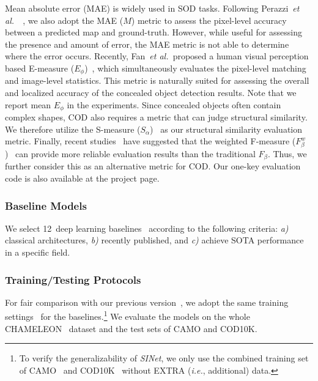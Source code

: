 \documentclass[10pt,journal,compsoc]{IEEEtran}
\def\ie{\emph{i.e.}}
\def\etal{{\em et al.~}}
\def\ournewmodel{\emph{SINet}}
\def\baselineN{12}
\begin{document}
Mean absolute error (MAE) is widely used in SOD tasks.
%
Following Perazzi~\etal~\cite{perazzi2012saliency}, 
we also adopt the MAE ($M$) metric to assess the pixel-level accuracy 
between a predicted map and ground-truth.
%
However, while useful for assessing the presence and amount of error, 
the MAE metric is not able to determine where the error occurs.
%
Recently, Fan~\etal proposed a human visual perception based 
E-measure ($E_\phi$)~\cite{Fan2018Enhanced}, 
which simultaneously evaluates the pixel-level matching and 
image-level statistics.
%
This metric is naturally suited for assessing the overall and
localized accuracy of the concealed object detection results.
%
Note that we report mean $E_\phi$ in the experiments.
%
Since concealed objects often contain complex shapes, 
COD also requires a metric that can judge structural similarity.
%
We therefore utilize the S-measure ($S_\alpha$)~\cite{fan2017structure}
as our structural similarity evaluation metric.
%
Finally, recent studies~\cite{Fan2018Enhanced,fan2017structure} have suggested 
that the weighted F-measure ($F_\beta^w$)~\cite{margolin2014evaluate} 
can provide more reliable evaluation results than the traditional $F_\beta$.
Thus, we further consider this as an alternative metric for COD.
%
Our one-key evaluation code is also available at the project page.


\subsubsection{Baseline Models}


We select \baselineN~deep learning baselines~\cite{lin2017feature,he2017mask,
zhao2017pyramid,zou2018DLMIA,liu2018picanet,huang2019mask,zhao2019pyramid,
wu2019cascaded,chen2019hybrid,zhao2019EGNet,le2019anabranch,fan2020pranet} according to the following criteria:
\textit{a)} classical architectures,
\textit{b)} recently published, and
\textit{c)} achieve SOTA performance in a specific field.
%

\subsubsection{Training/Testing Protocols}
%
For fair comparison with our previous version~\cite{fan2020camouflaged},
we adopt the same training settings~\cite{fan2020camouflaged} for the baselines.\footnote{To verify the generalizability of \ournewmodel, we only use the combined training set of CAMO~\cite{le2019anabranch} and 
COD10K~\cite{fan2020camouflaged} without EXTRA (\ie, additional) data.}
%
We evaluate the models on the whole CHAMELEON~\cite{2018Animal} dataset 
and the test sets of CAMO and COD10K.
%
%
\end{document}
